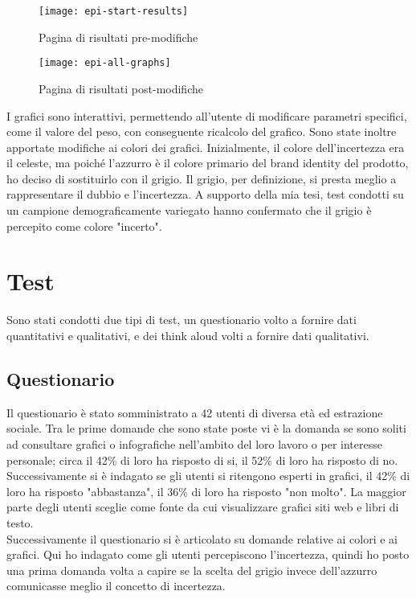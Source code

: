 \begin{figure}[!ht] 
    \centering 
    \texttt{[image: epi-start-results]} 
    \caption{Pagina di risultati pre-modifiche}
\end{figure}

\begin{figure}[!ht] 
    \centering 
    \texttt{[image: epi-all-graphs]} 
    \caption{Pagina di risultati post-modifiche}
\end{figure}

I grafici sono interattivi, permettendo all'utente di modificare parametri specifici, come il valore del peso, con conseguente ricalcolo del grafico. Sono state inoltre apportate modifiche ai colori dei grafici. Inizialmente, il colore dell'incertezza era il celeste, ma poiché l'azzurro è il colore primario del brand identity del prodotto, ho deciso di sostituirlo con il grigio. Il grigio, per definizione, si presta meglio a rappresentare il dubbio e l'incertezza. A supporto della mia tesi, test condotti su un campione demograficamente variegato hanno confermato che il grigio è percepito come colore "incerto".\\

\section{Test}
Sono stati condotti due tipi di test, un questionario volto a fornire dati quantitativi e qualitativi, e dei think aloud volti a fornire dati qualitativi. \\

\subsection{Questionario}
Il questionario è stato somministrato a 42 utenti di diversa età ed estrazione sociale. Tra le prime domande che sono state poste vi è la domanda se sono soliti ad consultare grafici o infografiche nell'ambito del loro lavoro o per interesse personale; circa il 42\% di loro ha risposto di si, il 52\% di loro ha risposto di no. Successivamente si è indagato se gli utenti si ritengono esperti in grafici, il 42\% di loro ha risposto "abbastanza", il 36\% di loro ha risposto "non molto". La maggior parte degli utenti sceglie come fonte da cui visualizzare grafici siti web e libri di testo.\\
Successivamente il questionario si è articolato su domande relative ai colori e ai grafici. Qui ho indagato come gli utenti percepiscono l'incertezza, quindi ho posto una prima domanda volta a capire se la scelta del grigio invece dell'azzurro comunicasse meglio il concetto di incertezza. 

